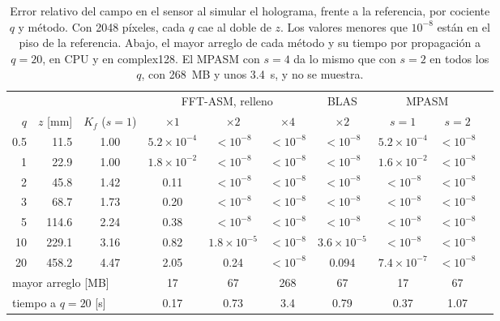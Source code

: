\begin{table}[htbp]
  \centering
  \small
  \caption[Interferometría simulada: error de la ida]{Error relativo del
  campo en el sensor al simular el holograma, frente a la referencia, por
  cociente $q$ y método. Con 2048 píxeles, cada $q$ cae al doble de $z$. Los
  valores menores que $10^{-8}$ están en el piso de la referencia. Abajo, el
  mayor arreglo de cada método y su tiempo por propagación a $q = 20$, en CPU
  y en complex128. El MPASM con $s = 4$ da lo mismo que con $s = 2$ en todos
  los $q$, con \SI{268}{MB} y unos \SI{3.4}{s}, y no se muestra.}
  \label{tab:larga}
  \setlength{\tabcolsep}{4pt}
  \begin{tabular}{rrcccccccc}
    \toprule
    & & & \multicolumn{3}{c}{FFT-ASM, relleno} & BLAS
      & \multicolumn{2}{c}{MPASM} \\
    \cmidrule(lr){4-6}\cmidrule(lr){8-9}
    $q$ & $z$ [mm] & $K_f$ ($s = 1$) & $\times1$ & $\times2$ & $\times4$
      & $\times2$ & $s = 1$ & $s = 2$ \\
    \midrule
    0.5 & 11.5  & 1.00 & $5.2\times10^{-4}$ & $<10^{-8}$ & $<10^{-8}$ & $<10^{-8}$
        & $5.2\times10^{-4}$ & $<10^{-8}$ \\
    1   & 22.9  & 1.00 & $1.8\times10^{-2}$ & $<10^{-8}$ & $<10^{-8}$ & $<10^{-8}$
        & $1.6\times10^{-2}$ & $<10^{-8}$ \\
    2   & 45.8  & 1.42 & 0.11 & $<10^{-8}$ & $<10^{-8}$ & $<10^{-8}$ & $<10^{-8}$
        & $<10^{-8}$ \\
    3   & 68.7  & 1.73 & 0.20 & $<10^{-8}$ & $<10^{-8}$ & $<10^{-8}$ & $<10^{-8}$
        & $<10^{-8}$ \\
    5   & 114.6 & 2.24 & 0.38 & $<10^{-8}$ & $<10^{-8}$ & $<10^{-8}$ & $<10^{-8}$
        & $<10^{-8}$ \\
    10  & 229.1 & 3.16 & 0.82 & $1.8\times10^{-5}$ & $<10^{-8}$ & $3.6\times10^{-5}$
        & $<10^{-8}$ & $<10^{-8}$ \\
    20  & 458.2 & 4.47 & 2.05 & 0.24 & $<10^{-8}$ & 0.094 & $7.4\times10^{-7}$
        & $<10^{-8}$ \\
    \midrule
    \multicolumn{3}{l}{mayor arreglo [MB]} & 17 & 67 & 268 & 67 & 17 & 67 \\
    \multicolumn{3}{l}{tiempo a $q = 20$ [s]} & 0.17 & 0.73 & 3.4 & 0.79 & 0.37
      & 1.07 \\
    \bottomrule
  \end{tabular}
\end{table}


